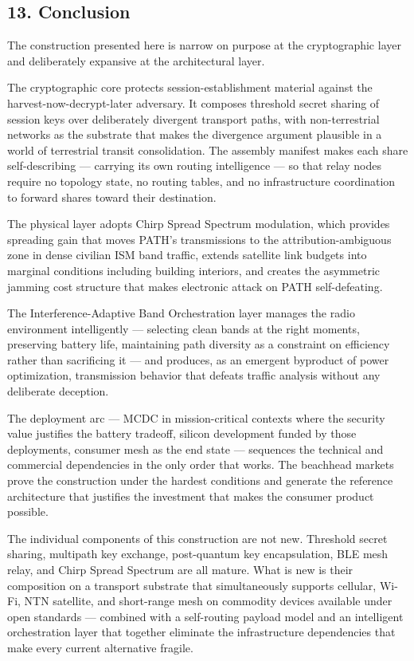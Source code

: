 \documentclass[
  11pt,
]{article}
\begin{document}
\hypertarget{conclusion}{%
\subsection{13. Conclusion}\label{conclusion}}

The construction presented here is narrow on purpose at the
cryptographic layer and deliberately expansive at the architectural
layer.

The cryptographic core protects session-establishment material against
the harvest-now-decrypt-later adversary. It composes threshold secret
sharing of session keys over deliberately divergent transport paths,
with non-terrestrial networks as the substrate that makes the divergence
argument plausible in a world of terrestrial transit consolidation. The
assembly manifest makes each share self-describing --- carrying its own
routing intelligence --- so that relay nodes require no topology state,
no routing tables, and no infrastructure coordination to forward shares
toward their destination.

The physical layer adopts Chirp Spread Spectrum modulation, which
provides spreading gain that moves PATH's transmissions to the
attribution-ambiguous zone in dense civilian ISM band traffic, extends
satellite link budgets into marginal conditions including building
interiors, and creates the asymmetric jamming cost structure that makes
electronic attack on PATH self-defeating.

The Interference-Adaptive Band Orchestration layer manages the radio
environment intelligently --- selecting clean bands at the right
moments, preserving battery life, maintaining path diversity as a
constraint on efficiency rather than sacrificing it --- and produces, as
an emergent byproduct of power optimization, transmission behavior that
defeats traffic analysis without any deliberate deception.

The deployment arc --- MCDC in mission-critical contexts where the
security value justifies the battery tradeoff, silicon development
funded by those deployments, consumer mesh as the end state ---
sequences the technical and commercial dependencies in the only order
that works. The beachhead markets prove the construction under the
hardest conditions and generate the reference architecture that
justifies the investment that makes the consumer product possible.

The individual components of this construction are not new. Threshold
secret sharing, multipath key exchange, post-quantum key encapsulation,
BLE mesh relay, and Chirp Spread Spectrum are all mature. What is new is
their composition on a transport substrate that simultaneously supports
cellular, Wi-Fi, NTN satellite, and short-range mesh on commodity
devices available under open standards --- combined with a self-routing
payload model and an intelligent orchestration layer that together
eliminate the infrastructure dependencies that make every current
alternative fragile.
\end{document}
